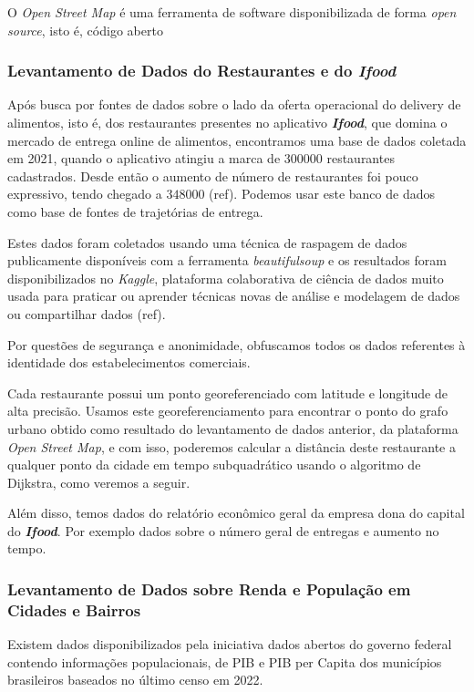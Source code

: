 \documentclass[14pt,a4paper]{article}
\begin{document}
	O \textit{Open Street Map} é uma ferramenta de software disponibilizada de forma \textit{open source}, isto é, código aberto 

	\subsubsection{Levantamento de Dados do Restaurantes e do \textit{Ifood}}
	
	Após busca por fontes de dados sobre o lado da oferta operacional do delivery de alimentos, isto é, dos restaurantes presentes no aplicativo \textit{\textbf{Ifood}}, que domina o mercado de entrega online de alimentos, encontramos uma base de dados coletada em 2021, quando o aplicativo atingiu a marca de $300000$ restaurantes cadastrados. Desde então o aumento de número de restaurantes foi pouco expressivo, tendo chegado a $348000$ (ref). Podemos usar este banco de dados como base de fontes de trajetórias de entrega. 
	
	Estes dados foram coletados usando uma técnica de raspagem de dados publicamente disponíveis com a ferramenta \textit{beautifulsoup} e os resultados foram disponibilizados no \textit{Kaggle}, plataforma colaborativa de ciência de dados muito usada para praticar ou aprender técnicas novas de análise e modelagem de dados ou compartilhar dados (ref).
	
	Por questões de segurança e anonimidade, obfuscamos todos os dados referentes à identidade dos estabelecimentos comerciais.
	
	Cada restaurante possui um ponto georeferenciado com latitude e longitude de alta precisão. Usamos este georeferenciamento para encontrar o ponto do grafo urbano obtido como resultado do levantamento de dados anterior, da plataforma \textit{Open Street Map}, e com isso, poderemos calcular a distância deste restaurante a qualquer ponto da cidade em tempo subquadrático usando o algoritmo de Dijkstra, como veremos a seguir.
	
	Além disso, temos dados do relatório econômico geral da empresa dona do capital do \textit{\textbf{Ifood}}. Por exemplo dados sobre o número geral de entregas e aumento no tempo.
	
	\subsubsection{Levantamento de Dados sobre Renda e População em Cidades e Bairros}
	
	Existem dados disponibilizados pela iniciativa dados abertos do governo federal contendo informações populacionais, de PIB e PIB per Capita dos municípios brasileiros baseados no último censo em 2022. 
	
\end{document}

